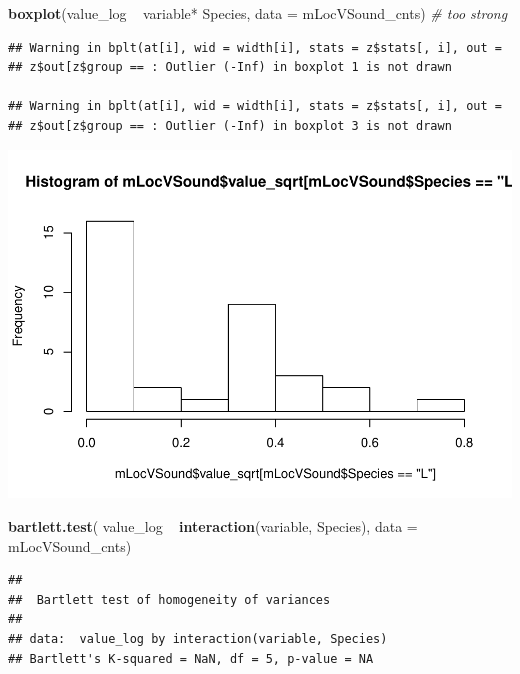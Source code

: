 \documentclass[]{article}
\newenvironment{Shaded}{\begin{snugshade}}{\end{snugshade}}
\newcommand{\KeywordTok}[1]{\textcolor[rgb]{0.13,0.29,0.53}{\textbf{{#1}}}}
\newcommand{\DataTypeTok}[1]{\textcolor[rgb]{0.13,0.29,0.53}{{#1}}}
\newcommand{\StringTok}[1]{\textcolor[rgb]{0.31,0.60,0.02}{{#1}}}
\newcommand{\CommentTok}[1]{\textcolor[rgb]{0.56,0.35,0.01}{\textit{{#1}}}}
\newcommand{\NormalTok}[1]{{#1}}
\begin{document}
\begin{Shaded}
\begin{Highlighting}[]
\KeywordTok{boxplot}\NormalTok{(value_log ~}\StringTok{  }\NormalTok{variable*}\StringTok{ }\NormalTok{Species, }\DataTypeTok{data =} \NormalTok{mLocVSound_cnts) }\CommentTok{# too strong}
\end{Highlighting}
\end{Shaded}

\begin{verbatim}
## Warning in bplt(at[i], wid = width[i], stats = z$stats[, i], out =
## z$out[z$group == : Outlier (-Inf) in boxplot 1 is not drawn

## Warning in bplt(at[i], wid = width[i], stats = z$stats[, i], out =
## z$out[z$group == : Outlier (-Inf) in boxplot 3 is not drawn
\end{verbatim}

\includegraphics{Sensory_learning_files/figure-latex/unnamed-chunk-17-8.pdf}

\begin{Shaded}
\begin{Highlighting}[]
\KeywordTok{bartlett.test}\NormalTok{( value_log ~}\StringTok{  }\KeywordTok{interaction}\NormalTok{(variable, Species), }\DataTypeTok{data =} \NormalTok{mLocVSound_cnts)}
\end{Highlighting}
\end{Shaded}

\begin{verbatim}
## 
##  Bartlett test of homogeneity of variances
## 
## data:  value_log by interaction(variable, Species)
## Bartlett's K-squared = NaN, df = 5, p-value = NA
\end{verbatim}
\end{document}
